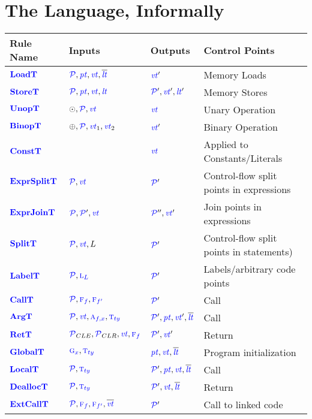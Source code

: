\documentclass{llncs}
\begin{document}
\section{The Language, Informally}
\label{sec:language}

\begin{table}[t]
  \begin{tabular}{|l|l|l|l|}
    \hline
    Rule Name & Inputs & Outputs & Control Points \\
    \hline
    \(\loadtname\)      & \(\loadtargs\)         & \(\loadtres\)      & Memory Loads \\
    \(\storetname\)     & \(\storetargs\)        & \(\storetres\)     & Memory Stores \\
    \(\unoptname\)      & \(\unoptargs\)         & \(\unoptres\)      & Unary Operation \\
    \(\binoptname\)     & \(\binoptargs\)        & \(\binoptres\)     & Binary Operation \\
    \(\consttname\)     &                        & \(\consttres\)     & Applied to Constants/Literals \\
    \(\exprsplittname\) & \(\exprsplittargs\)    & \(\exprsplittres\) & Control-flow split points in expressions \\
    \(\exprjointname\)  & \(\exprjointargs\)     & \(\exprjointres\)  & Join points in expressions \\
    \(\splittname\)     & \(\splittargs\)        & \(\splittres\)     & Control-flow split points in statements)\\
    \(\labeltname\)     & \(\labeltargs\)        & \(\labeltres\)     & Labels/arbitrary code points \\
    \(\calltname\)      & \(\calltargs\)         & \(\calltres\)      & Call \\
    \(\argtname\)       & \(\argtargs\)          & \(\argtres\)       & Call \\
    \(\rettname\)       & \(\rettargs\)          & \(\rettres\)       & Return \\
    \(\globaltname\)    & \(\globaltargs\)       & \(\globaltres\)    & Program initialization \\
    \(\localtname\)     & \(\localtargs\)        & \(\localtres\)     & Call \\
    \(\dealloctname\)   & \(\dealloctargs\)      & \(\dealloctres\)   & Return \\
    \(\extcalltname\)   & \(\extcalltargs\)      & \(\extcalltres\)   & Call to linked code \\

\end{tabular}
\end{table}
\end{document}
